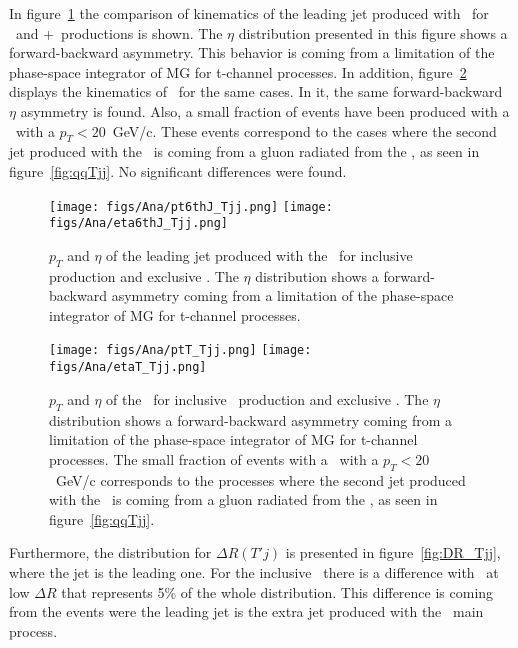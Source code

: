 In figure~\ref{fig:6thJ_Tjj} the comparison of kinematics of the leading jet produced with \Tp~for \Tj~and \Tj+\Tjj~productions is shown. The $\eta$ distribution presented in this figure shows a forward-backward asymmetry. This behavior is coming from a limitation of the phase-space integrator of MG for t-channel processes. In addition, figure~\ref{fig:T_Tjj} displays the kinematics of \Tp~for the same cases. In it, the same forward-backward $\eta$ asymmetry is found. Also, a small fraction of events have been produced with a \Tp~with a $p_{T}<20$~GeV/c. These events correspond to the cases where the second jet produced with the \Tp~is coming from a gluon radiated from the \Tp, as seen in figure~\ref{fig:qqTjj}. No significant differences were found.

\begin{figure}[!hbtp]
  \begin{center}
    \texttt{[image: figs/Ana/pt6thJ\_Tjj.png]}
    \texttt{[image: figs/Ana/eta6thJ\_Tjj.png]}
    \caption{$p_{T}$ and $\eta$ of the leading jet produced with the \Tp~for inclusive \Tjj production and exclusive \Tj. The $\eta$ distribution shows a forward-backward asymmetry coming from a limitation of the phase-space integrator of MG for t-channel processes.}
    \label{fig:6thJ_Tjj}
  \end{center}
\end{figure}

\begin{figure}[!hbtp]
  \begin{center}
    \texttt{[image: figs/Ana/ptT\_Tjj.png]}
    \texttt{[image: figs/Ana/etaT\_Tjj.png]}
    \caption{$p_{T}$ and $\eta$ of the \Tp~for inclusive \Tjj~production and exclusive \Tj. The $\eta$ distribution shows a forward-backward asymmetry coming from a limitation of the phase-space integrator of MG for t-channel processes. The small fraction of events with a \Tp~with a $p_{T}<20$~GeV/c corresponds to the processes where the second jet produced with the \Tp~is coming from a gluon radiated from the \Tp, as seen in figure~\ref{fig:qqTjj}.}
    \label{fig:T_Tjj}
  \end{center}
\end{figure}

Furthermore, the distribution for $\Delta R (T'j)$ is presented in figure~\ref{fig:DR_Tjj}, where the jet is the leading one. For the inclusive \Tjj~there is a difference with \Tj~at low $\Delta R$ that represents 5\% of the whole distribution. This difference is coming from the events were the leading jet is the extra jet produced with the \Tj~main process.

